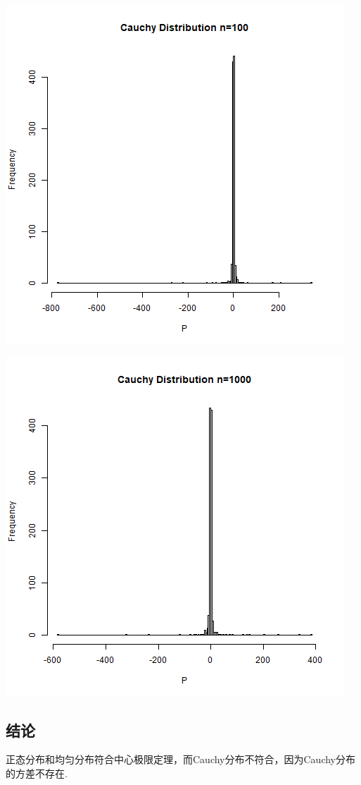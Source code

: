 \documentclass{article}
\begin{document}
\begin{CJK}{UTF8}{gbsn}
\begin{minipage}{0.5\textwidth}
\end{minipage}
\begin{minipage}{0.5\textwidth}
    \includegraphics[scale=0.6]{hist3-3.png}
\end{minipage}
\begin{minipage}{0.5\textwidth}
    \includegraphics[scale=0.6]{hist3-4.png}
\end{minipage}
\subsection{结论}
正态分布和均匀分布符合中心极限定理，而Cauchy分布不符合，因为Cauchy分布的方差不存在.
\end{CJK}
\end{document}
